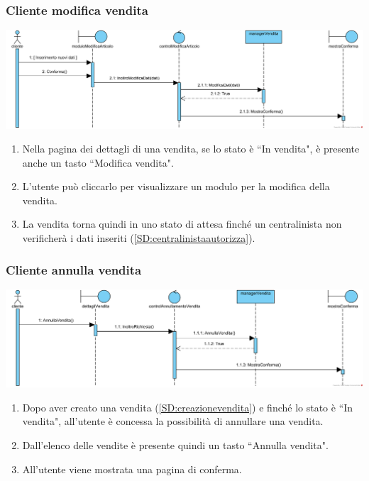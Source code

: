 \documentclass[12pt,a4paper]{article}
\begin{document}
\subsubsection{Cliente modifica vendita}
\label{SD:modificavendita}

\begin{center}
\includegraphics[width=\textwidth]{SequenceDiagram/ClienteVenditaModifica}
\end{center}

\begin{enumerate}
\item Nella pagina dei dettagli di una vendita, se lo stato è ``In vendita", è presente anche un tasto ``Modifica vendita".
\item L'utente può cliccarlo per visualizzare un modulo per la modifica della vendita. 
\item La vendita torna quindi in uno stato di attesa finché un centralinista non verificherà i dati inseriti (\ref{SD:centralinistaautorizza}).
\end{enumerate}

\subsubsection{Cliente annulla vendita}
\label{SD:annullavendita}

\begin{center}
\includegraphics[width=\textwidth]{SequenceDiagram/ClienteVenditaAnnulla}
\end{center}

\begin{enumerate}
\item Dopo aver creato una vendita (\ref{SD:creazionevendita}) e finché lo stato è ``In vendita", all'utente è concessa la possibilità di annullare una vendita.
\item Dall'elenco delle vendite è presente quindi un tasto ``Annulla vendita".
\item All'utente viene mostrata una pagina di conferma.
\end{enumerate}
\end{document}
